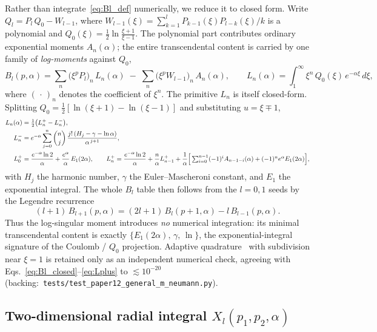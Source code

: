 \documentclass[aps,pra,twocolumn,superscriptaddress,longbibliography]{revtex4-2}
\begin{document}
Rather than integrate~\eqref{eq:Bl_def} numerically, we reduce it to
closed form.  Write $Q_l = P_l\,Q_0 - W_{l-1}$, where
$W_{l-1}(\xi) = \sum_{k=1}^{l} P_{k-1}(\xi)P_{l-k}(\xi)/k$ is a
polynomial and $Q_0(\xi) = \tfrac12\ln\frac{\xi+1}{\xi-1}$.  The
polynomial part contributes ordinary exponential moments $A_n(\alpha)$;
the entire transcendental content is carried by one family of
\emph{log-moments} against $Q_0$,
\begin{equation}
  B_l(p,\alpha) = \sum_n \big(\xi^p P_l\big)_n\,L_n(\alpha)
  \;-\; \sum_n \big(\xi^p W_{l-1}\big)_n\,A_n(\alpha),
  \qquad
  L_n(\alpha) = \int_1^\infty \xi^n\,Q_0(\xi)\,e^{-\alpha\xi}\,d\xi,
  \label{eq:Bl_closed}
\end{equation}
where $(\,\cdot\,)_n$ denotes the coefficient of $\xi^n$.  The
primitive $L_n$ is itself closed-form.  Splitting
$Q_0 = \tfrac12[\ln(\xi+1)-\ln(\xi-1)]$ and substituting $u=\xi\mp1$,
\begin{align}
  L_n(\alpha) &= \tfrac12\big(L^{+}_n - L^{-}_n\big), \notag\\
  L^{-}_n &= e^{-\alpha}\sum_{j=0}^{n}\binom{n}{j}\,
             \frac{j!\,(H_j-\gamma-\ln\alpha)}{\alpha^{\,j+1}},
  \label{eq:Lminus}\\
  L^{+}_0 &= \frac{e^{-\alpha}\ln 2}{\alpha} + \frac{e^{\alpha}}{\alpha}\,E_1(2\alpha),
  \qquad
  L^{+}_n = \frac{e^{-\alpha}\ln 2}{\alpha} + \frac{n}{\alpha}L^{+}_{n-1}
            + \frac{1}{\alpha}\Big[\textstyle\sum_{i=0}^{n-1}(-1)^i A_{n-1-i}(\alpha)
            + (-1)^n e^{\alpha}E_1(2\alpha)\Big],
  \label{eq:Lplus}
\end{align}
with $H_j$ the harmonic number, $\gamma$ the Euler--Mascheroni constant,
and $E_1$ the exponential integral.  The whole $B_l$ table then follows
from the $l = 0, 1$ seeds by the Legendre recurrence
\begin{equation}
  (l+1)\,B_{l+1}(p,\alpha) = (2l+1)\,B_l(p+1,\alpha) - l\,B_{l-1}(p,\alpha).
  \label{eq:Bl_recurrence}
\end{equation}
Thus the log-singular moment introduces \emph{no} numerical
integration: its minimal transcendental content is exactly
$\{E_1(2\alpha),\,\gamma,\,\ln\}$, the exponential-integral signature of
the Coulomb / $Q_0$ projection.  Adaptive
quadrature~\cite{QUADPACK} with subdivision near $\xi = 1$ is retained
only as an independent numerical check, agreeing with
Eqs.~\eqref{eq:Bl_closed}--\eqref{eq:Lplus} to
$\lesssim\!10^{-20}$ (backing:\
\texttt{tests/test\_paper12\_general\_m\_neumann.py}).

\subsection{Two-dimensional radial integral
\texorpdfstring{$X_l(p_1, p_2, \alpha)$}{Xl(p1, p2, alpha)}}
\end{document}
